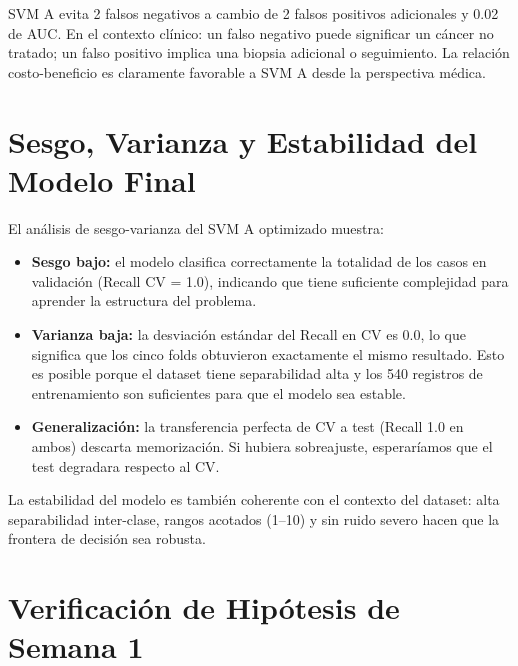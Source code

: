 \documentclass[11pt,a4paper]{article}
\begin{document}
SVM A evita 2 falsos negativos a cambio de 2 falsos positivos adicionales y 0.02 de AUC. En el contexto clínico: un falso negativo puede significar un cáncer no tratado; un falso positivo implica una biopsia adicional o seguimiento. La relación costo-beneficio es claramente favorable a SVM A desde la perspectiva médica.

\section{Sesgo, Varianza y Estabilidad del Modelo Final}

El análisis de sesgo-varianza del SVM A optimizado muestra:

\begin{itemize}[leftmargin=1.4cm]
\item \textbf{Sesgo bajo:} el modelo clasifica correctamente la totalidad de los casos en validación (Recall CV = 1.0), indicando que tiene suficiente complejidad para aprender la estructura del problema.
\item \textbf{Varianza baja:} la desviación estándar del Recall en CV es 0.0, lo que significa que los cinco folds obtuvieron exactamente el mismo resultado. Esto es posible porque el dataset tiene separabilidad alta y los 540 registros de entrenamiento son suficientes para que el modelo sea estable.
\item \textbf{Generalización:} la transferencia perfecta de CV a test (Recall 1.0 en ambos) descarta memorización. Si hubiera sobreajuste, esperaríamos que el test degradara respecto al CV.
\end{itemize}

La estabilidad del modelo es también coherente con el contexto del dataset: alta separabilidad inter-clase, rangos acotados (1--10) y sin ruido severo hacen que la frontera de decisión sea robusta.

\section{Verificación de Hipótesis de Semana 1}
\end{document}
